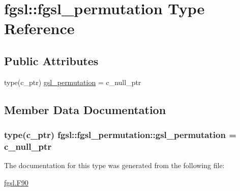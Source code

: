 \hypertarget{structfgsl_1_1fgsl__permutation}{\section{fgsl\-:\-:fgsl\-\_\-permutation Type Reference}
\label{structfgsl_1_1fgsl__permutation}
}
\subsection*{Public Attributes}
\begin{DoxyCompactItemize}
\item 
type(c\-\_\-ptr) \hyperlink{structfgsl_1_1fgsl__permutation_a3ebd91ca28e16168ff91b0ccadacb06c}{gsl\-\_\-permutation} = c\-\_\-null\-\_\-ptr
\end{DoxyCompactItemize}


\subsection{Member Data Documentation}
\hypertarget{structfgsl_1_1fgsl__permutation_a3ebd91ca28e16168ff91b0ccadacb06c}{
\subsubsection[{gsl\-\_\-permutation}]{\setlength{\rightskip}{0pt plus 5cm}type(c\-\_\-ptr) fgsl\-::fgsl\-\_\-permutation\-::gsl\-\_\-permutation = c\-\_\-null\-\_\-ptr}}\label{structfgsl_1_1fgsl__permutation_a3ebd91ca28e16168ff91b0ccadacb06c}


The documentation for this type was generated from the following file\-:\begin{DoxyCompactItemize}
\item 
\hyperlink{fgsl_8F90}{fgsl.\-F90}\end{DoxyCompactItemize}
